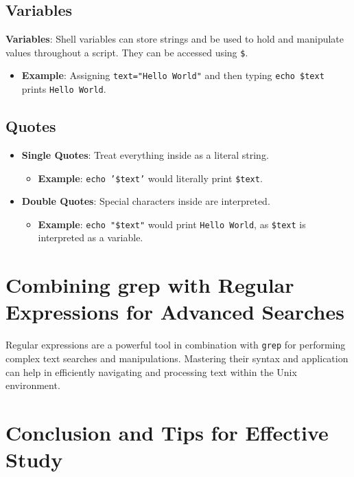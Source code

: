 \documentclass{article}
\begin{document}
\subsection{Variables}

\textbf{Variables}: Shell variables can store strings and be used to hold and manipulate values throughout a script. They can be accessed using \texttt{\$}.

\begin{itemize}
    \item \textbf{Example}: Assigning \texttt{text="Hello World"} and then typing \texttt{echo \$text} prints \texttt{Hello World}.
\end{itemize}

\subsection{Quotes}

\begin{itemize}
    \item \textbf{Single Quotes}: Treat everything inside as a literal string.
    \begin{itemize}
        \item \textbf{Example}: \texttt{echo '\$text'} would literally print \texttt{\$text}.
    \end{itemize}
    \item \textbf{Double Quotes}: Special characters inside are interpreted.
    \begin{itemize}
        \item \textbf{Example}: \texttt{echo "\$text"} would print \texttt{Hello World}, as \texttt{\$text} is interpreted as a variable.
    \end{itemize}
\end{itemize}

\section{Combining grep with Regular Expressions for Advanced Searches}

Regular expressions are a powerful tool in combination with \texttt{grep} for performing complex text searches and manipulations. Mastering their syntax and application can help in efficiently navigating and processing text within the Unix environment.

\section{Conclusion and Tips for Effective Study}
\end{document}

